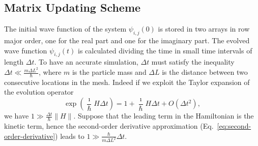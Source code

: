 \subsection{Matrix Updating Scheme}
The initial wave function of the system $\psi_{i,j}(0)$ is stored in two arrays in row major order, one for the real part and one for the imaginary part. The evolved wave function $\psi_{i,j}(t)$ is calculated dividing the time in small time intervals of length $\Delta t$. To have an accurate simulation, $\Delta t$ must satisfy the inequality $\Delta t \ll \frac{m \Delta L^2}{\hbar}$, where $m$ is the particle mass and $\Delta L$ is the distance between two consecutive locations in the mesh. Indeed if we exploit the Taylor expansion of the evolution operator
\begin{equation}
\exp \left( \frac{\imath}{\hbar}H\Delta t \right) = 1 + \frac{\imath}{\hbar}H\Delta t + O(\Delta t^2),
\end{equation} 
we have $1 \gg \frac{\Delta t}{\hbar}\| H \| $. Suppose that the leading term in the Hamiltonian is the kinetic term, hence the second-order derivative approximation (Eq.~\eqref{eq:second-order-derivative}) leads to $1 \gg \frac{\hbar}{m \Delta L^2} \Delta t$.

